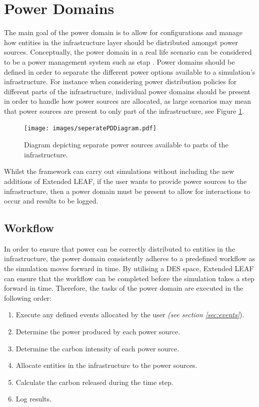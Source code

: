 \documentclass{l4proj}
\begin{document}
\section{Power Domains}\label{sec:power-domains}
The main goal of the power domain is to allow for configurations and manage how entities in the infrastructure layer should be distributed amongst power sources.
Conceptually, the power domain in a real life scenario can be considered to be a power management system such as etap \citep{etap}.
Power domains should be defined in order to separate the different power options available to a simulation's infrastructure.
For instance when considering power distribution policies for different parts of the infrastructure, individual power domains should be present in order to handle how power sources are allocated, as large scenarios may mean that power sources are present to only part of the infrastructure, see Figure \ref{fig:seperatePDs}.
\begin{figure}[htbp]
    \centering
    \texttt{[image: images/seperatePDDiagram.pdf]}
    ~
    \caption{Diagram depicting separate power sources available to parts of the infrastructure.}
    \label{fig:seperatePDs}
\end{figure}

Whilst the framework can carry out simulations without including the new additions of Extended LEAF, if the user wants to provide power sources to the infrastructure, then a power domain must be present to allow for interactions to occur and results to be logged.

\subsection{Workflow}\label{subsec:power-domain-workflow}
In order to ensure that power can be correctly distributed to entities in the infrastructure, the power domain consistently adheres to a predefined workflow as the simulation moves forward in time.
By utilising a DES space, Extended LEAF can ensure that the workflow can be completed before the simulation takes a step forward in time.
Therefore, the tasks of the power domain are executed in the following order:
\begin{enumerate}
    \item Execute any defined events allocated by the user \emph{(see section \ref{sec:events}}).
    \item Determine the power produced by each power source.
    \item Determine the carbon intensity of each power source.
    \item Allocate entities in the infrastructure to the power sources.
    \item Calculate the carbon released during the time step.
    \item Log results.
\end{enumerate}
\end{document}
